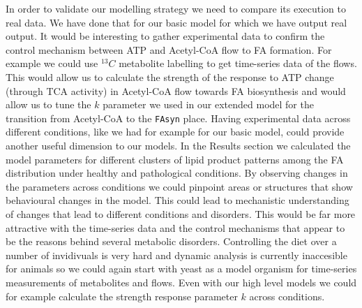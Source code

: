 In order to validate our modelling strategy we need to compare its execution to real data. We have done
that for our basic model for which we have output real output. It would be interesting to gather experimental data to confirm the
control mechanism between ATP and Acetyl-CoA flow to FA formation. For
example we could use $^{13}C$ metabolite labelling to get time-series
data of the flows. This would allow us to calculate the strength of
the response to ATP change (through TCA activity) in Acetyl-CoA flow towards FA biosynthesis
and would allow us to tune the $k$ parameter we used in our extended
model for the transition from Acetyl-CoA to the \texttt{FAsyn}
place. Having experimental data across different conditions, like we
had for example for our basic model, could provide another useful
dimension to our models. In the Results section we calculated the
model parameters for different clusters of lipid product patterns among the FA distribution under healthy and pathological conditions. By
observing changes in the parameters across conditions we could
pinpoint areas or structures that show behavioural changes in the model. This could lead
to mechanistic understanding of changes that lead to different
conditions and disorders. This would be far more attractive with the
time-series data and the control mechanisms that appear to be the
reasons behind several metabolic disorders. Controlling the diet over
a number of invidivuals is very hard and dynamic analysis is currently
inaccesible for animals so we could again start with yeast as a
model organism for time-series measurements of metabolites and
flows. Even with our high level
models we could for example calculate the strength response parameter
$k$ across conditions.


